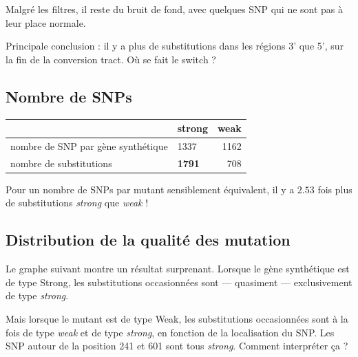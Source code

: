 \documentclass[a4paper]{tufte-handout}
\begin{document}
Malgré les filtres, il reste du bruit de fond, avec quelques SNP qui ne sont pas
à leur place normale.

Principale conclusion : il y a plus de substitutions dans les régions 3' que 5',
sur la fin de la conversion tract. Où se fait le switch ? 


\subsection{Nombre de SNPs}
\label{sec:orgheadline6}

\begin{center}
\begin{tabular}{llr}
\toprule
 & strong & weak\\
\midrule
nombre de SNP par gène synthétique & 1337 & 1162\\
nombre de substitutions & \textbf{1791} & 708\\
\bottomrule
\end{tabular}
\end{center}

Pour un nombre de SNPs par mutant sensiblement équivalent, il y a \(2.53\) fois
plus de substitutions \emph{strong} que \emph{weak} !

\subsection{Distribution de la qualité des mutation}
\label{sec:orgheadline7}

Le graphe suivant montre un résultat surprenant. Lorsque le gène synthétique est
de type Strong, les substitutions occasionnées sont --- quasiment ---
exclusivement de type \emph{strong}. 

Mais lorsque le mutant est de type Weak, les substitutions occasionnées sont à la
fois de type \emph{weak} et de type \emph{strong}, en fonction de la localisation du SNP.
Les SNP autour de la position 241 et 601 sont tous \emph{strong}. Comment interpréter
ça ?
\end{document}
